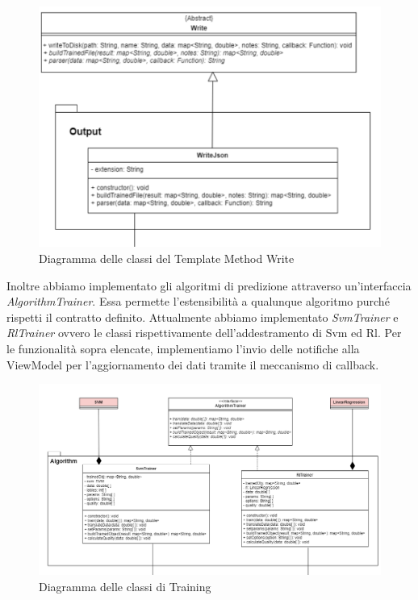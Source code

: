 			\mbox{}
			\begin{figure} [H]
				\includegraphics[width=\linewidth]{./img/Diagrammi/write.png}
				\caption{Diagramma delle classi del Template Method Write}
			\end{figure}
			Inoltre abbiamo implementato gli algoritmi di predizione attraverso un'interfaccia \textit{AlgorithmTrainer}. Essa permette l'estensibilità a qualunque algoritmo purché rispetti il contratto definito. Attualmente abbiamo implementato \textit{SvmTrainer} e \textit{RlTrainer} ovvero le classi rispettivamente dell'addestramento di Svm ed Rl.
			Per le funzionalità sopra elencate, implementiamo l'invio delle notifiche alla ViewModel per l'aggiornamento dei dati tramite il meccanismo di callback.
			\mbox{}
			\begin{landscape}
			\begin{figure} [H]
				\includegraphics[width=\linewidth]{./img/Diagrammi/Training.png}
				\caption{Diagramma delle classi di Training}
			\end{figure}	
			\end{landscape}		
